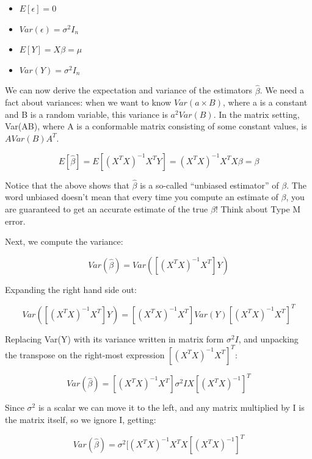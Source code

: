 \documentclass[12pt,]{krantz}
\providecommand{\tightlist}{%
  \setlength{\itemsep}{0pt}\setlength{\parskip}{0pt}}
\begin{document}
\begin{itemize}
\tightlist
\item
  \(E[\epsilon]=0\)
\item
  \(Var(\epsilon)=\sigma^2 I_n\)
\item
  \(E[Y]=X\beta=\mu\)
\item
  \(Var(Y)=\sigma^2 I_n\)
\end{itemize}

We can now derive the expectation and variance of the estimators \(\hat\beta\). We need a fact about variances: when we want to know \(Var(a\times B)\), where a is a constant and B is a random variable, this variance is \(a^2 Var(B)\). In the matrix setting, Var(AB), where A is a conformable matrix consisting of some constant values, is \(A Var(B)A^T\).

\begin{equation}
E[\hat\beta] = E[(X^TX)^{-1}X^T Y] = (X^TX)^{-1}X^T X\beta = \beta
\end{equation}

Notice that the above shows that \(\hat\beta\) is a so-called ``unbiased estimator'' of \(\beta\). The word unbiased doesn't mean that every time you compute an estimate of \(\beta\), you are guaranteed to get an accurate estimate of the true \(\beta\)! Think about Type M error.

Next, we compute the variance:

\begin{equation}
Var(\hat\beta) = Var([(X^TX)^{-1}X^T] Y)
\end{equation}

Expanding the right hand side out:

\begin{equation}
Var([(X^TX)^{-1}X^T] Y) = [(X^TX)^{-1}X^T] Var(Y)  [(X^TX)^{-1}X^T]^{T}
\end{equation}

Replacing Var(Y) with its variance written in matrix form \(\sigma^2 I\), and unpacking the transpose on the right-most expression \([(X^TX)^{-1}X^T]^{T}\):

\begin{equation}
Var(\hat\beta)= [(X^TX)^{-1}X^T] \sigma^2 I  X[(X^TX)^{-1}]^{T} 
\end{equation}

Since \(\sigma^2\) is a scalar we can move it to the left, and any matrix multiplied by I is the matrix itself, so we ignore I, getting:

\begin{equation}
Var(\hat\beta)= \sigma^2 [(X^TX)^{-1}X^T X[(X^TX)^{-1}]^{T} 
\end{equation}
\end{document}

